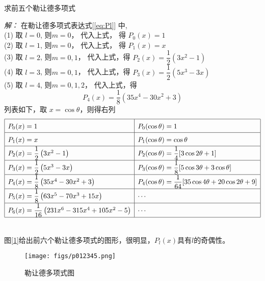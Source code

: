 	 \begin{example}
	 求前五个勒让德多项式
	 \end{example}
	\emph{解：}
		在勒让德多项式表达式[\ref{eq:Pl}] 中, \\ 
	(1) 取 $l=0$, 则$m=0$， 代入上式， 得 $P_{0}(x) =1$ \\  
	(2) 取 $l=1$, 则$m=0$， 代入上式， 得 $P_{1}(x) =x$\\
	(3) 取 $l=2$, 则$m=0,1$， 代入上式，得 
	$ P_{2}(x) = \dfrac{1}{2}\left(3 x^{2}-1\right) $\\
	(4) 取 $l=3$, 则$m=0,1$， 代入上式，得 
	$ P_{3}(x) = \dfrac{1}{2}\left(5 x^{3}-3 x\right)  $ \\
	(5) 取 $l=4$, 则$m=0,1,2$， 代入上式，得 
	$$ P_{4}(x) = \dfrac{1}{8}\left(35 x^{4}-30 x^{2}+3\right)  $$
	列表如下，取 $x=\cos\theta$，则得右列
	$$\renewcommand\arraystretch{1.6}
	\begin{array}{|l|l|}
		\hline P_{0}(x)=1 & P_{0}(\cos\theta)=1\\
		\hline P_{1}(x)=x & P_{1}(\cos \theta)=\cos \theta \\
		\hline P_{2}(x)=\dfrac{1}{2}\left(3 x^{2}-1\right) & P_{2}(\cos \theta)=\dfrac{1}{4}[3 \cos 2 \theta+1] \\ 
		\hline P_{3}(x)=\dfrac{1}{2}\left(5 x^{3}-3 x\right) & P_{3}(\cos \theta)=\dfrac{1}{8}[5 \cos 3 \theta+3 \cos \theta] \\
		\hline P_{4}(x)=\dfrac{1}{8}\left(35 x^{4}-30 x^{2}+3\right) & P_{4}(\cos \theta)=\dfrac{1}{64}[35 \cos 4 \theta+20 \cos 2 \theta+9] \\
		\hline P_{5}(x)=\dfrac{1}{8}\left(63 x^{5}-70 x^{3}+15 x\right) & \cdots  \\
		\hline P_{6}(x)=\dfrac{1}{16}\left(231 x^{6}-315 x^{4}+105 x^2 -5\right) & \cdots  \\
		\hline
	\end{array}$$
	
	~~\\ 
	图[\ref{fig:p012345}]给出前六个勒让德多项式的图形，很明显，$P_{l}(x)$具有$l$的奇偶性。
	
	\begin{figure}[h]
		\centering
		\texttt{[image: figs/p012345.png]}
		\caption{勒让德多项式图}
		\label{fig:p012345}
	\end{figure}
	

